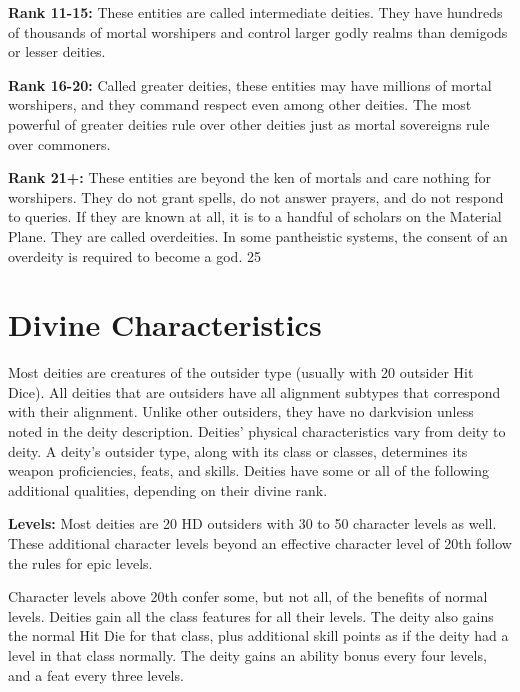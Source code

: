\documentclass{article}
\begin{document}
\vspace{12pt}
\textbf{Rank 11-15:} These entities are called intermediate deities. They have 
hundreds of thousands of mortal worshipers and control larger godly realms than 
demigods or lesser deities. 

\vspace{12pt}
\textbf{Rank 16-20:} Called greater deities, these entities may have millions of 
mortal worshipers, and they command respect even among other deities. The most 
powerful of greater deities rule over other deities just as mortal sovereigns rule 
over commoners.

\vspace{12pt}
\textbf{Rank 21+:} These entities are beyond the ken of mortals and care nothing 
for worshipers. They do not grant spells, do not answer prayers, and do not respond 
to queries. If they are known at all, it is to a handful of scholars on the Material 
Plane. They are called overdeities. In some pantheistic systems, the consent of 
an overdeity is required to become a god.{\color{color08} 25}

\vspace{12pt}
\section*{Divine Characteristics}

Most deities are creatures of the outsider type (usually with 20 outsider Hit Dice). 
All deities that are outsiders have all alignment subtypes that correspond with 
their alignment.  Unlike other outsiders, they have no darkvision unless noted 
in the deity description. Deities' physical characteristics vary from deity to 
deity. A deity's outsider type, along with its class or classes, determines its 
weapon proficiencies, feats, and skills. Deities have some or all of the following 
additional qualities, depending on their divine rank.

\vspace{12pt}
\textbf{Levels:} Most deities are 20 HD outsiders with 30 to 50 character levels 
as well. These additional character levels beyond an effective character level 
of 20th follow the rules for epic levels.

Character levels above 20th confer some, but not all, of the benefits of normal 
levels. Deities gain all the class features for all their levels. The deity also 
gains the normal Hit Die for that class, plus additional skill points as if the 
deity had a level in that class normally. The deity gains an ability bonus every 
four levels, and a feat every three levels.
\end{document}
